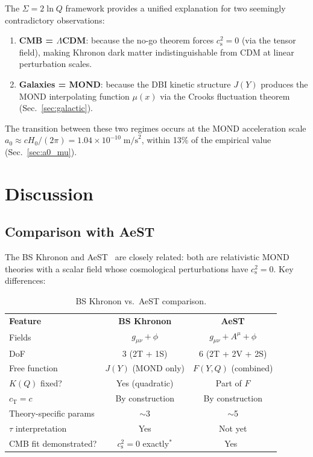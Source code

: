 \documentclass[prd,twocolumn,superscriptaddress,longbibliography,floatfix]{revtex4-2}
\newcommand{\tauasym}{\tau}
\newcommand{\cs}{c_{\mathrm{s}}}
\newcommand{\cT}{c_{\mathrm{T}}}
\begin{document}
The $\Sigma = 2\ln Q$ framework provides a unified explanation for
two seemingly contradictory observations:
\begin{enumerate}
\item \textbf{CMB = $\Lambda$CDM}: because the no-go theorem forces
  $\cs^2 = 0$ (via the tensor field), making Khronon dark matter
  indistinguishable from CDM at linear perturbation scales.
\item \textbf{Galaxies = MOND}: because the DBI kinetic structure
  $J(Y)$ produces the MOND interpolating function $\mu(x)$ via the
  Crooks fluctuation theorem (Sec.~\ref{sec:galactic}).
\end{enumerate}

The transition between these two regimes occurs at the MOND
acceleration scale $a_0 \approx cH_0/(2\pi) = 1.04 \times 10^{-10}\;\mathrm{m/s}^2$,
within 13\% of the empirical value (Sec.~\ref{sec:a0_mu}).


\section{Discussion}
\label{sec:discussion}

\subsection{Comparison with AeST}

The BS Khronon and AeST~\cite{SZ2021prl,SZ2021extended,SV2024,Bataki2023}
are closely related: both are relativistic MOND theories with
a scalar field whose cosmological perturbations have $\cs^2 = 0$.
Key differences:

\begin{table}[b]
\caption{\label{tab:comparison}BS Khronon vs.\ AeST comparison.}
\begin{ruledtabular}
\begin{tabular}{lcc}
\textbf{Feature} & \textbf{BS Khronon} & \textbf{AeST} \\
\colrule
Fields & $g_{\mu\nu} + \phi$ & $g_{\mu\nu} + A^\mu + \phi$ \\
DoF & 3 (2T + 1S) & 6 (2T + 2V + 2S) \\
Free function & $J(Y)$ (MOND only) & $F(Y,Q)$ (combined) \\
$K(Q)$ fixed? & Yes (quadratic) & Part of $F$ \\
$\cT = c$ & By construction & By construction \\
Theory-specific params & $\sim$3 & $\sim$5 \\
$\tauasym$ interpretation & Yes & Not yet \\
CMB fit demonstrated? & $\cs^2 = 0$ exactly$^*$ & Yes~\cite{SZ2021prl} \\
\end{tabular}
\end{ruledtabular}
\end{table}
\end{document}

